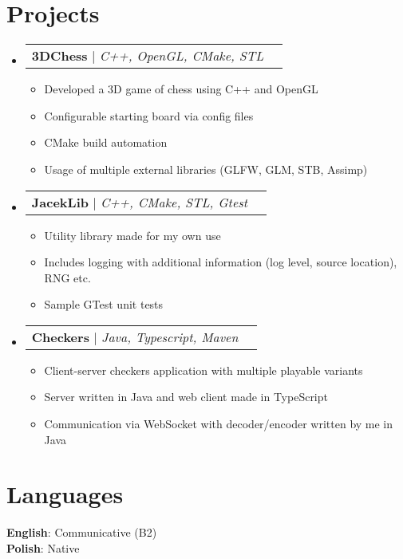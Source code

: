 \documentclass[letterpaper,11pt]{article}
\makeatletter
\newcommand{\resumeItem}[1]{
  \item\small{
    {#1 \vspace{-2pt}}
  }
}
\newcommand{\resumeProjectHeading}[2]{
    \item
    \begin{tabular*}{0.97\textwidth}{l@{\extracolsep{\fill}}r}
      \small#1 & #2 \\
    \end{tabular*}\vspace{-7pt}
}
\newcommand{\resumeSubHeadingListStart}{\begin{itemize}[leftmargin=0.15in, label={}]}
\newcommand{\resumeSubHeadingListEnd}{\end{itemize}}
\newcommand{\resumeItemListStart}{\begin{itemize}}
\newcommand{\resumeItemListEnd}{\end{itemize}\vspace{-5pt}}
\makeatother
\begin{document}
\section{Projects}
    \resumeSubHeadingListStart
        \resumeProjectHeading
            {\textbf{3DChess} $|$ \emph
                {C++, OpenGL, CMake, STL}
            }
            {\small{\href
                {https://github.com/Moztanku/3DChess}
                {\underline{github.com/Moztanku/3DChess}}
            }}
            \resumeItemListStart
                \resumeItem{Developed a 3D game of chess using C++ and OpenGL}
                \resumeItem{Configurable starting board via config files}
                \resumeItem{CMake build automation}
                \resumeItem{Usage of multiple external libraries (GLFW, GLM, STB, Assimp)}
            \resumeItemListEnd

        \resumeProjectHeading
            {\textbf{JacekLib} $|$ \emph
                {C++, CMake, STL, Gtest}
            }
            {\small{\href
                {https://github.com/Moztanku/JacekLib}
                {\underline{github.com/Moztanku/JacekLib}}
            }}
            \resumeItemListStart
                \resumeItem{Utility library made for my own use}
                \resumeItem{Includes logging with additional information (log level, source location), RNG etc.}
                \resumeItem{Sample GTest unit tests}
            \resumeItemListEnd
        \resumeProjectHeading
            {\textbf{Checkers} $|$ \emph
                {Java, Typescript, Maven}
            }
            {\small{\href
                {https://github.com/Moztanku/Checkers}
                {\underline{github.com/Moztanku/Checkers}}
            }}
            \resumeItemListStart
                \resumeItem{Client-server checkers application with multiple playable variants}
                \resumeItem{Server written in Java and web client made in TypeScript}
                \resumeItem{Communication via WebSocket with decoder/encoder written by me in Java}
            \resumeItemListEnd
            
    \resumeSubHeadingListEnd

\section{Languages}
    \begin{itemize}[leftmargin=0.15in, label={}]
        \small{\item{
            \textbf{English}{: Communicative (B2)} \\
            \textbf{Polish}{: Native} \\
        }}
    \end{itemize}
%
\end{document}
